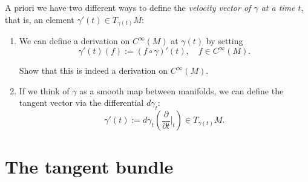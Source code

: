 A priori we have two different ways to define the \emph{velocity vector of $\gamma$ at a time $t$}, that is, an element $\gamma'(t) \in T_{\gamma(t)}M$:
\begin{enumerate}
    \item We can define a derivation on $C^\infty(M)$ at $\gamma(t)$ by setting
    \begin{equation}
        \gamma'(t) (f) := (f\circ\gamma)'(t), \quad f\in C^\infty(M).
    \end{equation}
    \begin{exe}
        Show that this is indeed a derivation on $C^\infty(M)$.
    \end{exe}
    \item If we think of $\gamma$ as a smooth map between manifolds, we can define the tangent vector via the differential $d\gamma_t$:
    \begin{equation}
        \gamma'(t):= d\gamma_t\left(\frac{\partial}{\partial t}\Big|_t\right) \in T_{\gamma(t)}M.
    \end{equation}
\end{enumerate}


\section{The tangent bundle}